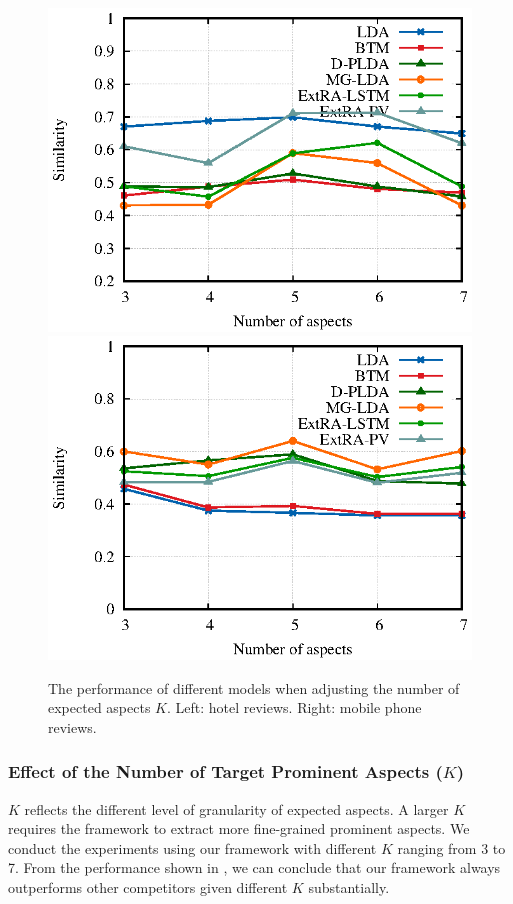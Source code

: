 \begin{figure}[th] 
	\centering
	{
		\includegraphics[width=0.8\columnwidth]{data/aspects_hotel}
\hspace*{1cm}
		\includegraphics[width=0.8\columnwidth]{data/aspects_mobile}}
	\caption{The performance of different models when adjusting the number of 
		expected aspects $K$. Left: hotel reviews. Right: mobile phone reviews.
		\label{fig:differentk}}
\end{figure}
\subsubsection{Effect of the Number of Target Prominent Aspects ($K$)}
$K$ reflects the different level of granularity of expected aspects.
A larger $K$ requires the framework to extract 
more fine-grained prominent aspects.
We conduct the experiments using our framework 
with different $K$ ranging from 3 to 7.
From the performance shown in  ,
we can conclude that our framework always outperforms 
other competitors given different $K$ substantially.


